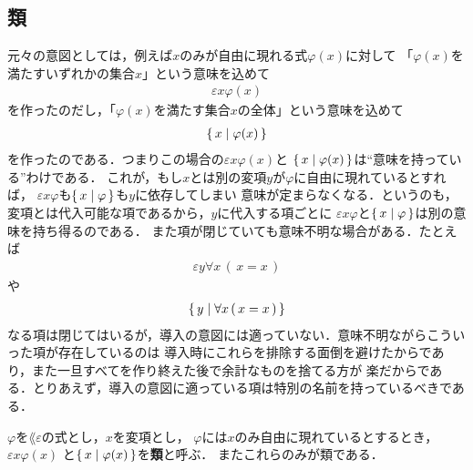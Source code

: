 \subsection{類}
	\begin{comment}
	\begin{screen}
		\begin{dfn}[閉項]
			どの変項も自由に現れない$\varepsilon$項を
			{\bf 閉${\boldsymbol \varepsilon}$項}\index{
			へいイプシロンこう@閉$\varepsilon$項}{\bf (closed epsilon term)}と呼び，
			どの変項も自由に現れない内包項を{\bf 閉内包項}\index{
			へいないほうこう@閉内包項}{\bf (closed comprehension term)}と呼ぶ．
			また閉$\varepsilon$項と閉内包項は以上のみである．
		\end{dfn}
	\end{screen}
	\end{comment}
	
	元々の意図としては，例えば$x$のみが自由に現れる式$\varphi(x)$に対して
	「$\varphi(x)$を満たすいずれかの集合$x$」という意味を込めて
	\begin{align}
		\varepsilon x \varphi(x)
	\end{align}
	を作ったのだし，「$\varphi(x)$を満たす集合$x$の全体」という意味を込めて
	\begin{align}
		\{\, x \mid \varphi(x)\, \}
	\end{align}
	を作ったのである．つまりこの場合の$\varepsilon x \varphi(x)$と
	$\{\, x \mid \varphi(x)\, \}$は``意味を持っている''わけである．
	これが，もし$x$とは別の変項$y$が$\varphi$に自由に現れているとすれば，
	$\varepsilon x \varphi$も$\{\, x \mid \varphi\, \}$も$y$に依存してしまい
	意味が定まらなくなる．というのも，変項とは代入可能な項であるから，$y$に代入する項ごとに
	$\varepsilon x \varphi$と$\{\, x \mid \varphi\, \}$は別の意味を持ち得るのである．
	また項が閉じていても意味不明な場合がある．たとえば
	\begin{align}
		\varepsilon y \forall x\, (\, x = x\, )
	\end{align}
	や
	\begin{align}
		\{\, y \mid \forall x\, (\, x = x\, )\, \}
	\end{align}
	なる項は閉じてはいるが，導入の意図には適っていない．意味不明ながらこういった項が存在しているのは
	導入時にこれらを排除する面倒を避けたからであり，また一旦すべてを作り終えた後で余計なものを捨てる方が
	楽だからである．とりあえず，導入の意図に適っている項は特別の名前を持っているべきである．
	
	\begin{screen}
		\begin{dfn}[類]
			$\varphi$を$\lang{\varepsilon}$の式とし，$x$を変項とし，
			$\varphi$には$x$のみ自由に現れているとするとき，$\varepsilon x \varphi(x)$
			と$\{\, x \mid \varphi(x)\, \}$を{\bf 類}と呼ぶ．
			またこれらのみが類である．
		\end{dfn}
	\end{screen}
	
